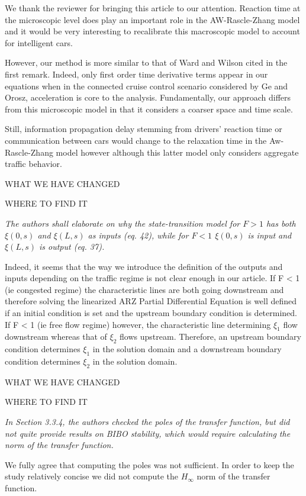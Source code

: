 \documentclass{article}
\begin{document}
We thank the reviewer for bringing this article to our attention. Reaction time at the microscopic level does play an important role in the AW-Rascle-Zhang model and it would be very interesting to recalibrate this macroscopic model to account for intelligent cars. 

However, our method is more similar to that of Ward and Wilson cited in the first remark. Indeed, only first order time derivative terms appear in our equations when in the connected cruise control scenario considered by Ge and Orosz, acceleration is core to the analysis. Fundamentally, our approach differs from this microscopic model in that it considers a coarser space and time scale. 

Still, information propagation delay stemming from drivers' reaction time or communication between cars would change to the relaxation time in the Aw-Rascle-Zhang model however although this latter model only considers aggregate traffic behavior.

WHAT WE HAVE CHANGED

WHERE TO FIND IT

\bigskip{}

\emph{
The authors shall elaborate on why the state-transition model for $F>1$ has both $\xi(0,s)$ and $\xi(L,s)$ as inputs (eq. 42), while for $F<1$ $\xi(0,s)$ is input and $\xi(L,s)$ is output (eq. 37).
}

Indeed, it seems that the way we introduce the definition of the outputs and inputs depending on the traffic regime is not clear enough in our article.
If F < 1 (ie congested regime) the characteristic lines are both going downstream and therefore solving the linearized ARZ Partial Differential Equation is well defined if an initial condition is set and the upstream boundary condition is determined.
If F < 1 (ie free flow regime) however, the characteristic line determining $\xi_1$ flow downstream whereas that of $\xi_2$ flows upstream. Therefore, an upstream boundary condition determines $\xi_1$ in the solution domain and a downstream boundary condition determines $\xi_2$ in the solution domain.

WHAT WE HAVE CHANGED

WHERE TO FIND IT

\emph{
In Section 3.3.4, the authors checked the poles of the transfer function, but did not quite provide results on BIBO stability, which would require calculating the norm of the transfer function.
}

We fully agree that computing the poles was not sufficient. In order to keep the study relatively concise we did not compute the  $H_{\infty}$ norm of the transfer function. 
\end{document}
